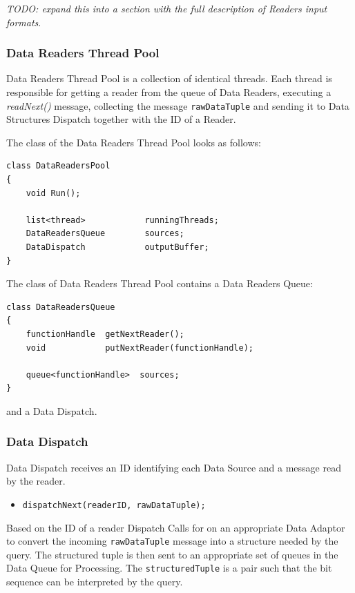\documentclass[14pt]{article}
\begin{document}
\noindent \emph{TODO: expand this into a section with the full description of Readers input formats}.




\subsubsection{Data Readers Thread Pool}

Data Readers Thread Pool is a collection of identical threads. Each thread is responsible for getting a reader from the queue of Data Readers, executing a \emph{readNext()} message, collecting the message {\tt rawDataTuple} and sending it to Data Structures Dispatch together with the ID of a Reader.

The class of the Data Readers Thread Pool looks as follows:
\begin{verbatim}
class DataReadersPool
{
	void Run();
	
    list<thread>            runningThreads;
    DataReadersQueue        sources;
    DataDispatch            outputBuffer;
}
\end{verbatim}

\noindent The class of Data Readers Thread Pool contains a Data Readers Queue:

\begin{verbatim}
class DataReadersQueue
{
	functionHandle  getNextReader();
	void            putNextReader(functionHandle);
	
    queue<functionHandle>  sources;
}
\end{verbatim}

\noindent and a Data Dispatch.

\subsubsection{Data Dispatch}

Data Dispatch receives an ID identifying each Data Source and a message read by the reader. 

\begin{itemize}
	\item {\tt dispatchNext(readerID, rawDataTuple);}
\end{itemize}

Based on the ID of a reader Dispatch Calls for on an appropriate Data Adaptor to convert the incoming {\tt rawDataTuple} message into a structure needed by the query. The structured tuple is then sent to an appropriate set of queues in the Data Queue for Processing. The {\tt structuredTuple} is a pair {\tt <size, bit-sequence>} such that the bit sequence can be interpreted by the query. 
\end{document}
